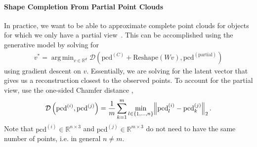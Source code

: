 \documentclass{article}
\DeclareMathOperator*{\argmin}{arg\,min}
\newcommand{\pcx}[1]{\mathrm{pcd}^{(#1)}}
\newcommand{\wxy}[2]{W_{#1 \rightarrow #2}}
\newcommand{\vxy}[2]{V_{#1 \rightarrow #2}}
\newcommand{\pci}{\pcx{i}}
\newcommand{\pcj}{\pcx{j}}
\newcommand{\pcc}{\pcx{C}}
\newcommand{\wij}{\wxy{i}{j}}
\begin{document}

\paragraph{Shape Completion From Partial Point Clouds}

In practice, we want to be able to approximate complete point clouds for objects for which we only have a partial view~\cite{thompson21shapebased}. This can be accomplished using the generative model by solving for 
\begin{align}
    v^* = \argmin_{v \in \mathbb{R}^{d}} \mathcal{D}(\pcc + \mathrm{Reshape}(Wv), \pcx{\mathrm{partial}})
\end{align}
using gradient descent on $v$. Essentially, we are solving for the latent vector that gives us a reconstruction closest to the observed points. To account for the partial view, \citet{thompson21shapebased} use the one-sided Chamfer distance \cite{barrow77parametric},
\begin{align}
    \mathcal{D}\left( \pci, \pcj \right) = \frac{1}{m} \sum_{k=1}^{m} \min_{l \in \{1, ..., n\}} \norm{ \pci_l - \pcj_k }_2.
    \label{eqn:chamfer}
\end{align}
Note that $\pci \in \mathbb{R}^{n \times 3}$ and $\pcj \in \mathbb{R}^{m \times 3}$ do not need to have the same number of points, i.e. in general $n \neq m$. 



\end{document}
